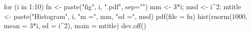 \begin{Schunk}
\begin{Sinput}
 for (i in 1:10){
    fn <- paste("fig", i, ".pdf", sep="")
    mm <- 3*i; msd <- i^2;
    mtitle <- paste("Histogram", i, "m =", mm, "sd =", msd)
    pdf(file = fn)
    hist(rnorm(1000, mean = 3*i, sd = i^2),  main = mtitle)
    dev.off()
   }
\end{Sinput}
\end{Schunk}
